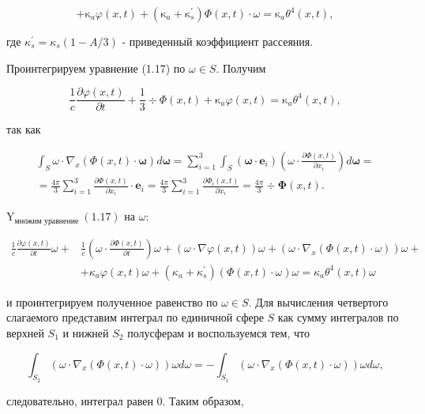 \documentclass[10pt]{article}
\begin{document}
$$
+\mathrm{\kappa}_{a} \varphi(x, t)+\left(\mathrm{\kappa}_{a}+\mathrm{\kappa}_{s}^{\prime}\right) \Phi(x, t) \cdot \omega=\mathrm{\kappa}_{a} \theta^{4}(x, t),
$$

где $\kappa_{s}^{\prime}=\kappa_{s}(1-A / 3)$ - приведенный коэффициент рассеяния.

Проинтегрируем уравнение (1.17) по $\omega \in S$. Получим

$$
\frac{1}{c} \frac{\partial \varphi(x, t)}{\partial t}+\frac{1}{3} \div \Phi(x, t)+\mathrm{\kappa}_{a} \varphi(x, t)=\mathrm{\kappa}_{a} \theta^{4}(x, t),
$$

так как

$$
\begin{gathered}
\int_{S} \omega \cdot \nabla_{x}(\Phi(x, t) \cdot \boldsymbol{\omega}) d \boldsymbol{\omega}=\sum_{i=1}^{3} \int_{S}\left(\boldsymbol{\omega} \cdot \mathbf{e}_{i}\right)\left(\omega \cdot \frac{\partial \Phi(x, t)}{\partial x_{i}}\right) d \boldsymbol{\omega}= \\
=\frac{4 \pi}{3} \sum_{i=1}^{3} \frac{\partial \Phi(x, t)}{\partial x_{i}} \cdot \mathbf{e}_{i}=\frac{4 \pi}{3} \sum_{i=1}^{3} \frac{\partial \Phi_{i}(x, t)}{\partial x_{i}}=\frac{4 \pi}{3} \div \boldsymbol{\Phi}(x, t) .
\end{gathered}
$$

$\mathrm{Y}_{\text {множим уравнение }}(1.17)$ на $\omega:$

$$
\begin{aligned}
\frac{1}{c} \frac{\partial \varphi(x, t)}{\partial t} \omega+& \frac{1}{c}\left(\omega \cdot \frac{\partial \Phi(x, t)}{\partial t}\right) \omega+(\omega \cdot \nabla \varphi(x, t)) \omega+\left(\omega \cdot \nabla_{x}(\Phi(x, t) \cdot \omega)\right) \omega+\\
&+\kappa_{a} \varphi(x, t) \omega+\left(\kappa_{a}+\kappa_{s}^{\prime}\right)(\Phi(x, t) \cdot \omega) \omega=\kappa_{a} \theta^{4}(x, t) \omega
\end{aligned}
$$

и проинтегрируем полученное равенство по $\omega \in S$. Для вычисления четвертого слагаемого представим интеграл по единичной сфере $S$ как сумму интегралов по верхней $S_{1}$ и нижней $S_{2}$ полусферам и воспользуемся тем, что

$$
\int_{S_{2}}\left(\omega \cdot \nabla_{x}(\Phi(x, t) \cdot \omega)\right) \omega d \omega=-\int_{S_{1}}\left(\omega \cdot \nabla_{x}(\Phi(x, t) \cdot \omega)\right) \omega d \omega,
$$

следовательно, интеграл равен 0. Таким образом,
\end{document}
